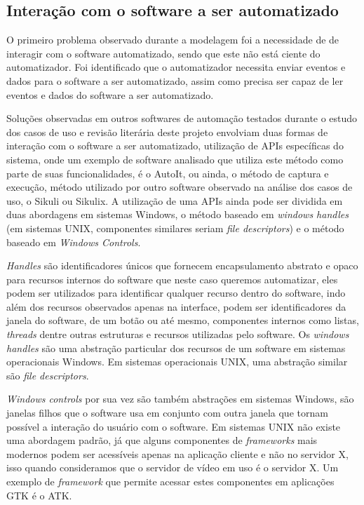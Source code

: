 \documentclass[tg]{mdtufsm}
\begin{document}
            \subsection {Interação com o software a ser automatizado}

                O primeiro problema observado durante a modelagem foi a necessidade de de interagir com o software automatizado, sendo que este não está ciente do automatizador. Foi identificado que o automatizador necessita enviar eventos e dados para o software a ser automatizado, assim como precisa ser capaz de ler eventos e dados do software a ser automatizado.

                Soluções observadas em outros softwares de automação testados durante o estudo dos casos de uso e revisão literária deste projeto envolviam duas formas de interação com o software a ser automatizado, utilização de APIs específicas do sistema, onde um exemplo de software analisado que utiliza este método como parte de suas funcionalidades, é o AutoIt, ou ainda, o método de captura e execução, método utilizado por outro software observado na análise dos casos de uso, o Sikuli ou Sikulix. A utilização de uma APIs ainda pode ser dividida em duas abordagens em sistemas Windows, o método baseado em \emph{windows handles} (em sistemas UNIX, componentes similares seriam \emph{file descriptors}) e o método baseado em \emph{Windows Controls}.

                \emph{Handles} são identificadores únicos que fornecem encapsulamento abstrato e opaco para recursos internos do software que neste caso queremos automatizar, eles podem ser utilizados para identificar qualquer recurso dentro do software, indo além dos recursos observados apenas na interface, podem ser identificadores da janela do software, de um botão ou até mesmo, componentes internos como listas, \emph{threads} dentre outras estruturas e recursos utilizadas pelo software. Os \emph{windows handles} são uma abstração particular dos recursos de um software em sistemas operacionais Windows. Em sistemas operacionais UNIX, uma abstração similar são \emph{file descriptors}.

                \emph{Windows controls} por sua vez são também abstrações em sistemas Windows, são janelas filhos que o software usa em conjunto com outra janela que tornam possível a interação do usuário com o software. Em sistemas UNIX não existe uma abordagem padrão, já que alguns componentes de \emph{frameworks} mais modernos podem ser acessíveis apenas na aplicação cliente e não no servidor X, isso quando consideramos que o servidor de vídeo em uso é o servidor X. Um exemplo de \emph{framework} que permite acessar estes componentes em aplicações GTK é o ATK.
\end{document}
